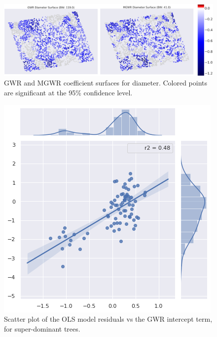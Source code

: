 \documentclass[12pt,a4paper]{article}
\begin{document}
\begin{figure}[H]
\centering
\includegraphics[scale=.13]{../figures/GWR_dbh.png}
\caption{GWR and MGWR coefficient surfaces for diameter.  Colored points are significant at the 95\% confidence level.}
\label{GWR_height} 
\end{figure}



\begin{figure}[H]
\centering
\includegraphics[scale=.65]{../figures/ModelComparison_Cnpy=1.png}
\caption{Scatter plot of the OLS model residuals vs the GWR intercept term, for super-dominant trees.}
\label{ModelComparison_Cnpy1} 
\end{figure}
\end{document}
